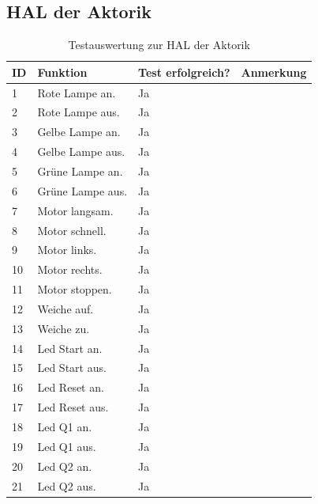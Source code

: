 \documentclass[a4paper, 11pt]{article}
\begin{document}
\subsection{HAL der Aktorik}
\begin{table}[h]
\center
\begin{tabularx}{\textwidth}{|l|X|X|X|}
\hline
\textbf{ID}&\textbf{Funktion}&\textbf{Test erfolgreich?}&\textbf{Anmerkung}\\
\hline
1&Rote Lampe an.&Ja&\\
\hline
2&Rote Lampe aus.&Ja&\\
\hline
3&Gelbe Lampe an.&Ja&\\
\hline
4&Gelbe Lampe aus.&Ja&\\
\hline
5&Grüne Lampe an.&Ja&\\
\hline
6&Grüne Lampe aus.&Ja&\\
\hline
7&Motor langsam.&Ja&\\
\hline
8&Motor schnell.&Ja&\\
\hline
9&Motor links.&Ja&\\
\hline
10&Motor rechts.&Ja&\\
\hline
11&Motor stoppen.&Ja&\\
\hline
12&Weiche auf.&Ja&\\
\hline
13&Weiche zu.&Ja&\\
\hline
14&Led Start an.&Ja&\\
\hline
15&Led Start aus.&Ja&\\
\hline
16&Led Reset an.&Ja&\\
\hline
17&Led Reset aus.&Ja&\\
\hline
18&Led Q1 an.&Ja&\\
\hline
19&Led Q1 aus.&Ja&\\
\hline
20&Led Q2 an.&Ja&\\
\hline
21&Led Q2 aus.&Ja&\\
\hline
\end{tabularx}
\caption{Testauswertung zur HAL der Aktorik}
\label{tsthal}
\end{table}

\newpage
\end{document}
